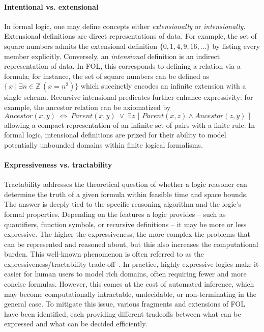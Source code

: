 \paragraph{Intentional vs. extensional}
%
In formal logic, one may define concepts either \emph{extensionally} or \emph{intensionally}.
%
Extensional definitions are direct representations of data.
%
For example, the set of square numbers admits the extensional definition $\{0,1,4,9,16,\dots\}$ by listing every member explicitly.
%
Conversely, an \emph{intensional} definition is an indirect representation of data.
%
In \gls{FOL}, this corresponds to defining a relation via a formula; for instance, the set of square numbers can be defined as $\{\,x\mid \exists n\in\mathbb{Z}\,(x = n^2)\}$ which succinctly encodes an infinite extension with a single schema.
%
Recursive intensional predicates further enhance expressivity: for example, the ancestor relation can be axiomatized by $\mathit{Ancestor}(x,y)\;\Leftrightarrow\;\mathit{Parent}(x,y)\;\lor\;\exists z\,[\,\mathit{Parent}(x,z)\wedge\mathit{Ancestor}(z,y)\,]$ allowing a compact representation of an infinite set of pairs with a finite rule.
%
In formal logic, intensional definitions are prized for their ability to model potentially unbounded domains within finite logical formalisms.


\paragraph{Expressiveness vs. tractability}
%
Tractability addresses the theoretical question of whether a logic reasoner can determine the truth of a given formula within feasible time and space bounds.
%
The answer is deeply tied to the specific reasoning algorithm and the logic's formal properties.
%
Depending on the features a logic provides -- such as quantifiers, function symbols, or recursive definitions -- it may be more or less expressive.
%
The higher the expressiveness, the more complex the problems that can be represented and reasoned about, but this also increases the computational burden.
%
This well-known phenomenon is often referred to as the expressiveness/tractability trade-off~\cite{DBLP:journals/jlp/CadoliS93,BRACHMAN2004327,DBLP:journals/ci/LevesqueB87}.
%
In practice, highly expressive logics make it easier for human users to model rich domains, often requiring fewer and more concise formulas.
%
However, this comes at the cost of automated inference, which may become computationally intractable, undecidable, or non-terminating in the general case.
%
To mitigate this issue, various fragments and extensions of \gls{FOL} have been identified, each providing different tradeoffs between what can be expressed and what can be decided efficiently.


